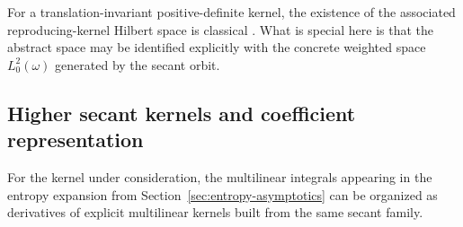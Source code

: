 \begin{remark}
For a translation-invariant positive-definite kernel, the existence of
the associated reproducing-kernel Hilbert space is classical
\cite{Aronszajn1950}.  What is special here is that the abstract space
may be identified explicitly with the concrete weighted space
$L^2_0(\omega)$ generated by the secant orbit.
\end{remark}

\subsection{Higher secant kernels and coefficient representation}

For the kernel under consideration, the multilinear integrals appearing
in the entropy expansion from Section~\ref{sec:entropy-asymptotics} can
be organized as derivatives of explicit multilinear kernels built from
the same secant family.

